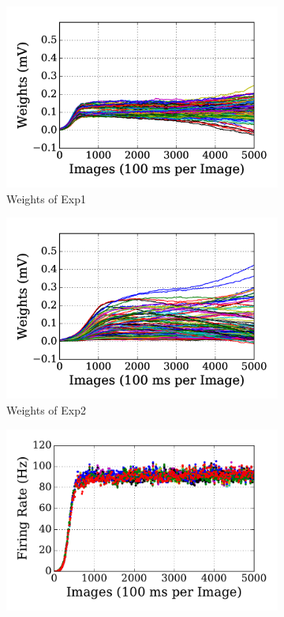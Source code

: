 \begin{figure}
	\centering
	\begin{subfigure}[t]{0.48\textwidth}
		\includegraphics[width=\textwidth]{pics_sdlm/00_exp_SAE_Orig/exp1_weights_s.png}
		\caption{Weights of Exp1}
	\end{subfigure}
	\begin{subfigure}[t]{0.48\textwidth}
		\includegraphics[width=\textwidth]{pics_sdlm/00_exp_SAE_Orig/exp2_weights_s.png}
		\caption{Weights of Exp2}
	\end{subfigure}
	\begin{subfigure}[t]{0.48\textwidth}
		\includegraphics[width=\textwidth]{pics_sdlm/00_exp_SAE_Orig/exp1_recon_s.pdf}

\end{subfigure}
\end{figure}
